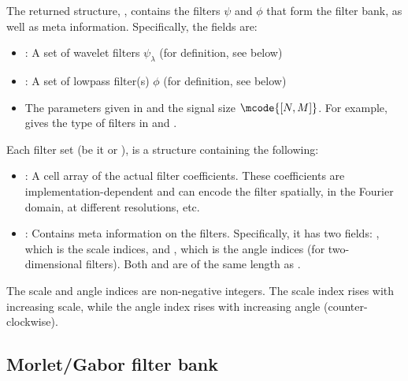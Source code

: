 \documentclass[twocolumn]{article}
\begin{document}
The returned structure, , contains the filters $\psi$ and $\phi$ that form the filter bank, as well as meta information. Specifically, the fields are:
\begin{itemize}
	\item {}: A set of wavelet filters $\psi_\lambda$ (for definition, see below)
	\item {}: A set of lowpass filter(s) $\phi$ (for definition, see below)
	\item The parameters given in  and the signal size $\mcode{[N,M]}$. For example,  gives the type of filters in  and .
\end{itemize}

Each filter set (be it  or ), is a structure  containing the following:
\begin{itemize}
	\item {}: A cell array of the actual filter coefficients. These coefficients are implementation-dependent and can encode the filter spatially, in the Fourier domain, at different resolutions, etc.
	\item {}: Contains meta information on the filters. Specifically, it has two fields: , which is the scale indices, and , which is the angle indices (for two-dimensional filters). Both  and  are of the same length as .
\end{itemize}

The scale and angle indices are non-negative integers. The scale index rises with increasing scale, while the angle index rises with increasing angle (counter-clockwise).

\subsection{Morlet/Gabor filter bank}
\end{document}
